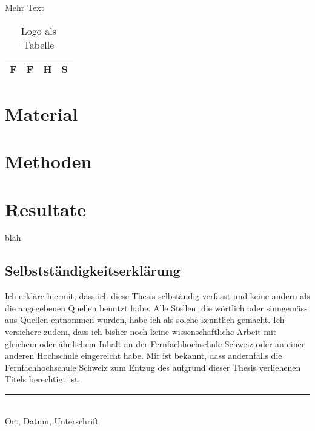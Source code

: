 \documentclass{ffhsthesis}
\begin{document}
    Mehr Text

    \begin{table}[ht]
        \begin{center}
            \begin{tabular}{|c|c|c|c|}
                \hline
                F & F & H & S \\
                \hline
            \end{tabular}
        \end{center}
        \caption{Logo als Tabelle}\label{tab:table}
    \end{table}

    \chapter{Material}

    \chapter{Methoden}

    \chapter{Resultate}



    \listoffigures

    \listoftables

    \begin{thebibliography}{XX}
         blah
    \end{thebibliography}

% 

    \newpage

    \begin{appendix}


        \chapter*{Selbstständigkeitserklärung}
        Ich erkläre hiermit, dass ich diese Thesis selbständig verfasst
        und keine andern als die angegebenen Quellen benutzt habe.
        Alle Stellen, die wörtlich oder sinngemäss aus Quellen entnommen wurden,
        habe ich als solche kenntlich gemacht. Ich versichere zudem, dass ich bisher
        noch keine wissenschaftliche Arbeit mit gleichem oder ähnlichem Inhalt an der
        Fernfachhochschule Schweiz oder an einer anderen Hochschule eingereicht habe.
        Mir ist bekannt, dass andernfalls die Fernfachhochschule Schweiz zum Entzug
        des aufgrund dieser Thesis verliehenen Titels berechtigt ist.

        \vspace{4cm}
        \noindent
        \hrule \ \\[-0.5ex]
        Ort, Datum, Unterschrift
    \end{appendix}
\end{document}
